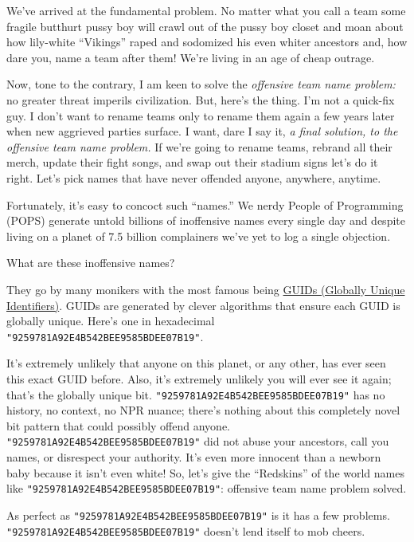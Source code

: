 We've arrived at the fundamental problem. No matter what you call a team
some fragile butthurt pussy boy will crawl out of the pussy boy closet
and moan about how lily-white ``Vikings'' raped and sodomized his even
whiter ancestors and, how dare you, name a team after them! We're living
in an age of cheap outrage.

Now, tone to the contrary, I am keen to solve the \emph{offensive team
name problem:} no greater threat imperils civilization. But, here's the
thing. I'm not a quick-fix guy. I don't want to rename teams only to
rename them again a few years later when new aggrieved parties surface.
I want, dare I say it, \emph{a final solution, to the offensive team
name problem.} If we're going to rename teams, rebrand all their merch,
update their fight songs, and swap out their stadium signs let's do it
right. Let's pick names that have never offended anyone, anywhere,
anytime.

Fortunately, it's easy to concoct such ``names.'' We nerdy People of
Programming (POPS) generate untold billions of inoffensive names every
single day and despite living on a planet of 7.5 billion complainers
we've yet to log a single objection.

What are these inoffensive names?

They go by many monikers with the most famous being
\href{https://www.uuidtools.com/what-is-uuid}{GUIDs (Globally Unique
Identifiers)}. GUIDs are generated by clever algorithms that ensure each
GUID is globally unique. Here's one in hexadecimal
\texttt{"9259781A92E4B542BEE9585BDEE07B19"}.

It's extremely unlikely that anyone on this planet, or any other, has
ever seen this exact GUID before. Also, it's extremely unlikely you will
ever see it again; that's the globally unique bit.
\texttt{"9259781A92E4B542BEE9585BDEE07B19"} has no history, no context, no NPR
nuance; there's nothing about this completely novel bit pattern that
could possibly offend anyone. \texttt{"9259781A92E4B542BEE9585BDEE07B19"} did not
abuse your ancestors, call you names, or disrespect your authority. It's
even more innocent than a newborn baby because it isn't even white! So,
let's give the ``Redskins'' of the world names like
\texttt{"9259781A92E4B542BEE9585BDEE07B19"}: offensive team name problem solved.

As perfect as \texttt{"9259781A92E4B542BEE9585BDEE07B19"} is it has a few
problems. \texttt{"9259781A92E4B542BEE9585BDEE07B19"} doesn't lend itself to mob
cheers.


